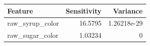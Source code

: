 \begin{longtable}{lrr}
\hline
 Feature           &   Sensitivity &    Variance \\
\hline
 raw\_syrup\_color &      16.5795  & 1.26218e-29 \\
 raw\_sugar\_color &       1.03234 & 0           \\
\hline
\end{longtable}
